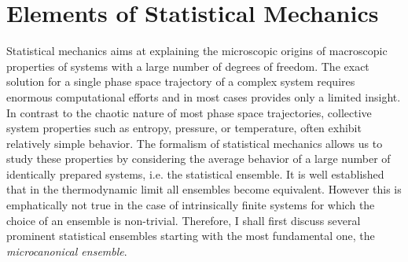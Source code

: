 \documentclass[12pt]{report}
\begin{document}
\chapter{Elements of Statistical Mechanics}
Statistical mechanics aims at explaining the microscopic origins of macroscopic properties of systems with a large number of degrees of freedom. The exact solution for a single phase space trajectory of a complex system requires enormous computational efforts and in most cases provides only a limited insight. In contrast to the chaotic nature of most phase space trajectories, collective system properties such as entropy, pressure, or temperature, often exhibit relatively simple behavior. The formalism of statistical mechanics allows us to study these properties by considering the average behavior of a large number of identically prepared systems, i.e. the statistical ensemble. It is well established that in the thermodynamic limit all ensembles become equivalent. However this is emphatically not true in the case of intrinsically finite systems for which the choice of an ensemble is non-trivial. Therefore, I shall first discuss several prominent statistical ensembles starting with the most fundamental one, the \textit{microcanonical ensemble}.
\end{document}

